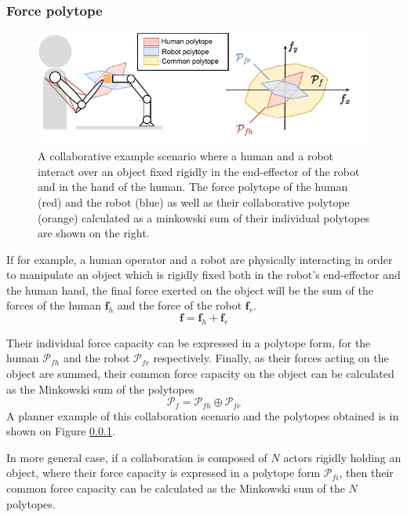 \subsubsection{Force polytope}
\label{ch:force_collab}
\begin{figure}[!h]
    \centering
    \includegraphics[width=0.7\linewidth]{Chapters/imgs/force_collab.pdf}
    \caption{A collaborative example scenario where a human and a robot interact over an object fixed rigidly in the end-effector of the robot and in the hand of the human. The force polytope of the human (red) and the robot (blue) as well as their collaborative polytope (orange) calculated as a minkowski sum of their individual polytopes are shown on the right.}
    \label{fig:collaboration_force}
\end{figure}

If for example, a human operator and a robot are physically interacting in order to manipulate an object which is rigidly fixed both in the robot's end-effector and the human hand, the final force exerted on the object will be the sum of the forces of the human $\bm{f}_h$ and the force of the robot $\bm{f}_r$.
\begin{equation}
    \bm{f} = \bm{f}_h + \bm{f}_r
\end{equation}

Their individual force capacity can be expressed in a polytope form, for the human  $\mathcal{P}_{fh}$ and the robot  $\mathcal{P}_{fr}$ respectively. Finally, as their forces acting on the object are summed, their common force capacity on the object can be calculated as the Minkowski sum of the polytopes
\begin{equation}
    \mathcal{P}_f =  \mathcal{P}_{fh} \oplus \mathcal{P}_{fr}
\end{equation}
A planner example of this collaboration scenario and the polytopes obtained is in shown on Figure \ref{ch:force_collab}. 

In more general case, if a collaboration is composed of $N$ actors rigidly holding an object, where their force capacity is expressed in a polytope form $\mathcal{P}_{fi}$, then their common force capacity can be calculated as the Minkowski sum of the $N$ polytopes.

